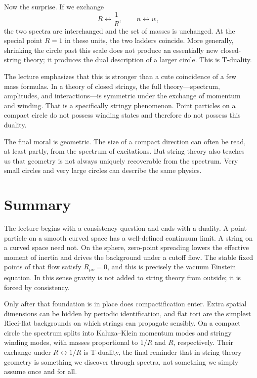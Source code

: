 Now the surprise. If we exchange
\begin{equation}
R \longleftrightarrow \frac{1}{R},
\qquad
n \longleftrightarrow w,
\end{equation}
the two spectra are interchanged and the set of masses is unchanged. At the special point \(R=1\) in these units, the two ladders coincide. More generally, shrinking the circle past this scale does not produce an essentially new closed-string theory; it produces the dual description of a larger circle. This is T-duality.

The lecture emphasizes that this is stronger than a cute coincidence of a few mass formulas. In a theory of closed strings, the full theory---spectrum, amplitudes, and interactions---is symmetric under the exchange of momentum and winding. That is a specifically stringy phenomenon. Point particles on a compact circle do not possess winding states and therefore do not possess this duality.

The final moral is geometric. The size of a compact direction can often be read, at least partly, from the spectrum of excitations. But string theory also teaches us that geometry is not always uniquely recoverable from the spectrum. Very small circles and very large circles can describe the same physics.

\section{Summary}

The lecture begins with a consistency question and ends with a duality. A point particle on a smooth curved space has a well-defined continuum limit. A string on a curved space need not. On the sphere, zero-point spreading lowers the effective moment of inertia and drives the background under a cutoff flow. The stable fixed points of that flow satisfy \(R_{\mu\nu}=0\), and this is precisely the vacuum Einstein equation. In this sense gravity is not added to string theory from outside; it is forced by consistency.

Only after that foundation is in place does compactification enter. Extra spatial dimensions can be hidden by periodic identification, and flat tori are the simplest Ricci-flat backgrounds on which strings can propagate sensibly. On a compact circle the spectrum splits into Kaluza--Klein momentum modes and stringy winding modes, with masses proportional to \(1/R\) and \(R\), respectively. Their exchange under \(R\leftrightarrow 1/R\) is T-duality, the final reminder that in string theory geometry is something we discover through spectra, not something we simply assume once and for all.